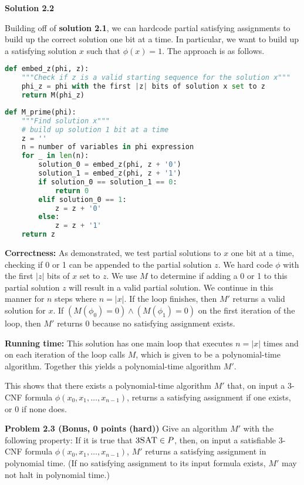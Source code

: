 \documentclass[11pt]{article}
\begin{document}
\textbf{Solution 2.2}

Building off of \textbf{solution 2.1}, we can hardcode partial satisfying assignments to build up the correct solution one bit at a time. In particular, we want to build up a satisfying solution $x$ such that $\phi(x) = 1$. The approach is as follows.

\begin{lstlisting}[language=Python]
def embed_z(phi, z):
    """Check if z is a valid starting sequence for the solution x"""
    phi_z = phi with the first |z| bits of solution x set to z
    return M(phi_z)
\end{lstlisting}

\begin{lstlisting}[language=Python]
def M_prime(phi):
    """Find solution x"""
    # build up solution 1 bit at a time
    z = ''
    n = number of variables in phi expression
    for _ in len(n):
        solution_0 = embed_z(phi, z + '0')
        solution_1 = embed_z(phi, z + '1')
        if solution_0 == solution_1 == 0:
            return 0
        elif solution_0 == 1:
            z = z + '0'
        else:
            z = z + '1'
    return z
\end{lstlisting}

\textbf{Correctness:} As demonstrated, we test partial solutions to $x$ one bit at a time, checking if 0 or 1 can be appended to the partial solution $z$. We hard code $\phi$ with the first $|z|$ bits of $x$ set to $z$. We use $M$ to determine if adding a 0 or 1 to this partial solution $z$ will result in a valid partial solution. We continue in this manner for $n$ steps where $n = |x|$. If the loop finishes, then $M'$ returns a valid solution for $x$. If $(M(\phi_0) = 0) \land (M(\phi_1) = 0)$ on the first iteration of the loop, then $M'$ returns 0 because no satisfying assignment exists.

\textbf{Running time:} This solution has one main loop that executes $n = |x|$ times and on each iteration of the loop calls $M$, which is given to be a polynomial-time algorithm. Together this yields a polynomial-time algorithm $M'$.

This shows that there exists a polynomial-time algorithm $M'$ that, on input a 3-CNF formula $\phi(x_0, x_1, \ldots, x_{n-1})$, returns a satisfying assignment if one exists, or 0 if none does.

\newpage

\textbf{Problem 2.3 (Bonus, 0 points (hard))} Give an algorithm $M'$ with the following property: If it is true that $\textsc{3SAT} \in P$, then, on input a satisfiable 3-CNF formula $\phi(x_0, x_1, \ldots, x_{n-1})$, $M'$ returns a satisfying assignment in polynomial time. (If no satisfying assignment to its input formula exists, $M'$ may not halt in polynomial time.)
\end{document}
